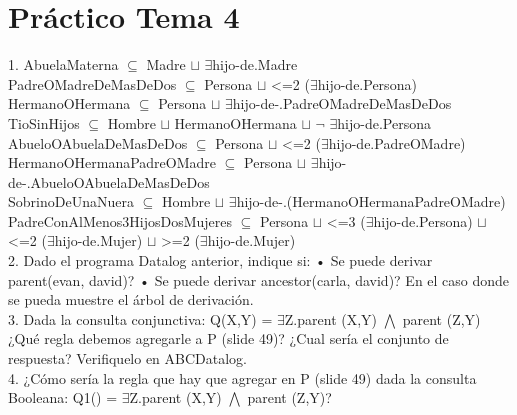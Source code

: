 \chapter{Práctico Tema 4}

1. AbuelaMaterna $\subseteq$ Madre $\sqcup$ $\exists$hijo-de.Madre\\


PadreOMadreDeMasDeDos $\subseteq$ Persona $\sqcup$ <=2 ($\exists$hijo-de.Persona)\\

HermanoOHermana $\subseteq$ Persona $\sqcup$ $\exists$hijo-de-.PadreOMadreDeMasDeDos\\

TioSinHijos $\subseteq$ Hombre $\sqcup$ HermanoOHermana $\sqcup$ $\neg$ $\exists$hijo-de.Persona\\


AbueloOAbuelaDeMasDeDos $\subseteq$ Persona $\sqcup$ <=2 ($\exists$hijo-de.PadreOMadre)\\

HermanoOHermanaPadreOMadre $\subseteq$ Persona $\sqcup$ $\exists$hijo-de-.AbueloOAbuelaDeMasDeDos\\

SobrinoDeUnaNuera $\subseteq$ Hombre $\sqcup$ $\exists$hijo-de-.(HermanoOHermanaPadreOMadre)\\


PadreConAlMenos3HijosDosMujeres $\subseteq$ Persona $\sqcup$ <=3 ($\exists$hijo-de.Persona) $\sqcup$ <=2 ($\exists$hijo-de.Mujer) $\sqcup$ >=2 ($\exists$hijo-de.Mujer)\\



2. Dado el programa Datalog anterior, indique si: • Se puede derivar parent(evan, david)? • Se puede derivar ancestor(carla, david)? En el caso donde se pueda muestre el árbol de derivación. \\


3. Dada la consulta conjunctiva: Q(X,Y) = $\exists$Z.parent (X,Y) $\bigwedge$ parent (Z,Y) ¿Qué regla debemos agregarle a P (slide 49)? ¿Cual sería el conjunto de respuesta? Verifiquelo en ABCDatalog.\\

4. ¿Cómo sería la regla que hay que agregar en P (slide 49) dada la consulta Booleana: Q1() = $\exists$Z.parent (X,Y) $\bigwedge$ parent (Z,Y)? \\

